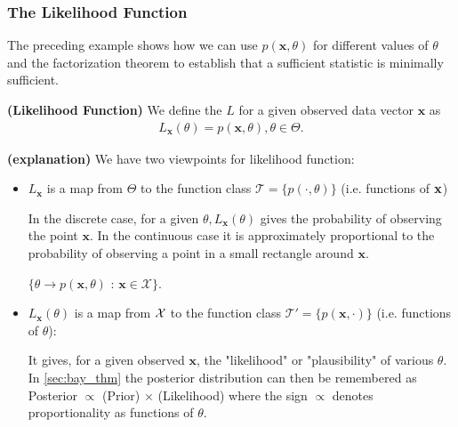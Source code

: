 \documentclass{article}
\newcommand{\bfs}[1]{\textbf{({#1}) }}
\begin{document}
\subsubsection{The Likelihood Function}
The preceding example shows how we can use $p(\mathbf{x}, \theta)$ for different values of $\theta$ and the factorization theorem to establish that a sufficient statistic is minimally sufficient. 
\begin{defa}\bfs{Likelihood Function}
We define the  $L$ for a given observed data vector $\mathbf{x}$ as
\begin{align*}
L_{\mathbf{x}}(\theta)=p(\mathbf{x}, \theta), \theta \in \Theta .
\end{align*}
\end{defa}
\begin{rema}\bfs{explanation}We have two viewpoints for likelihood function:
\begin{itemize}
    \item  $L_{\mathbf{x}}$ is a map from $\Theta$ to the function class $\mathcal{T}=\{p(\cdot, \theta)\}$ (i.e. functions of $\mathbf{x}$)
    
    In the discrete case, for a given $\theta, L_{\mathbf{x}}(\theta)$ gives the probability of observing the point $\mathbf{x}$. In the continuous case it is approximately proportional to the probability of observing a point in a small rectangle around $\mathbf{x}$. 
    
    $\{\theta \rightarrow p(\mathbf{x}, \theta)$ : $\mathbf{x} \in \mathcal{X}\} .$ 

    \item {} $L_{\mathbf{x}}(\theta)$ is a map from $\mathcal{X}$ to the function class $\mathcal{T}'=\{p(\mathbf{x}, \cdot)\}$ (i.e. functions of $\theta$):
    
    It gives, for a given observed $\mathbf{x}$, the "likelihood" or "plausibility" of various $\theta$. In \cref{sec:bay_thm} the posterior distribution can then be remembered as  Posterior $\propto$ (Prior) $\times$ (Likelihood) where the sign $\propto$ denotes proportionality as functions of $\theta$.
\end{itemize}
\end{rema}
\end{document}
